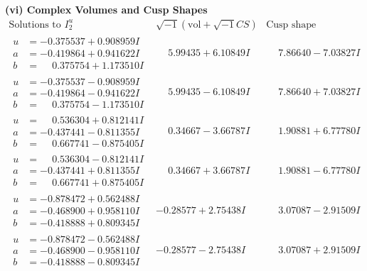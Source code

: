 \documentclass[1p]{elsarticle_modified}
\theoremstyle{definition}
\newcommand{\I}{\sqrt{-1}}
\begin{document}
\newpage\flushleft \textbf{(vi) Complex Volumes and Cusp Shapes}
$$\begin{array}{c|c|c}  
\text{Solutions to }I^u_{2}& \I (\text{vol} + \sqrt{-1}CS) & \text{Cusp shape}\\
 \hline 
\begin{aligned}
u &= -0.375537 + 0.908959 I \\
a &= -0.419864 + 0.941622 I \\
b &= \phantom{-}0.375754 + 1.173510 I\end{aligned}
 & \phantom{-}5.99435 + 6.10849 I & \phantom{-}7.86640 - 7.03827 I \\ \hline\begin{aligned}
u &= -0.375537 - 0.908959 I \\
a &= -0.419864 - 0.941622 I \\
b &= \phantom{-}0.375754 - 1.173510 I\end{aligned}
 & \phantom{-}5.99435 - 6.10849 I & \phantom{-}7.86640 + 7.03827 I \\ \hline\begin{aligned}
u &= \phantom{-}0.536304 + 0.812141 I \\
a &= -0.437441 - 0.811355 I \\
b &= \phantom{-}0.667741 - 0.875405 I\end{aligned}
 & \phantom{-}0.34667 - 3.66787 I & \phantom{-}1.90881 + 6.77780 I \\ \hline\begin{aligned}
u &= \phantom{-}0.536304 - 0.812141 I \\
a &= -0.437441 + 0.811355 I \\
b &= \phantom{-}0.667741 + 0.875405 I\end{aligned}
 & \phantom{-}0.34667 + 3.66787 I & \phantom{-}1.90881 - 6.77780 I \\ \hline\begin{aligned}
u &= -0.878472 + 0.562488 I \\
a &= -0.468900 + 0.958110 I \\
b &= -0.418888 + 0.809345 I\end{aligned}
 & -0.28577 + 2.75438 I & \phantom{-}3.07087 - 2.91509 I \\ \hline\begin{aligned}
u &= -0.878472 - 0.562488 I \\
a &= -0.468900 - 0.958110 I \\
b &= -0.418888 - 0.809345 I\end{aligned}
 & -0.28577 - 2.75438 I & \phantom{-}3.07087 + 2.91509 I \\ \hline\begin{aligned}

\end{aligned}
\end{array}$$
\end{document}
